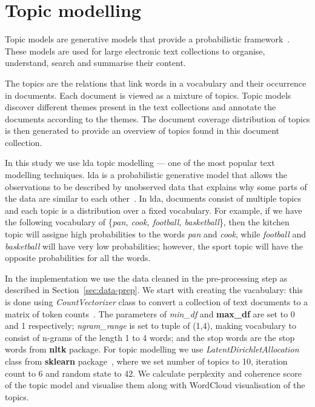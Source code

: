 \section{Topic modelling}
Topic models are generative models that provide a probabilistic framework~\cite{topic-model}. These models are used for large electronic text collections to organise, understand, search and summarise their content. 

The topics are the relations that link words in a vocabulary and their occurrence in documents. Each document is viewed as a mixture of topics. Topic models discover different themes present in the text collections and annotate the documents according to the themes. The document coverage distribution of topics is then generated to provide an overview of topics found in this document collection. 

In this study we use \acrfull{lda} topic modelling --- one of the most popular text modelling techniques. \Acrshort{lda} is a probabilistic generative model that allows the observations to be described by unobserved data that explains why some parts of the data are similar to each other~\cite{tong-topic-modelling}. In \acrshort{lda}, documents consist of multiple topics and each topic is a distribution over a fixed vocabulary. For example, if we have the  following vocabulary of \{\textit{pan, cook, football, basketball}\}, then the kitchen topic will assigne high probabilities to the words \textit{pan} and \textit{cook}, while \textit{football} and \textit{basketball} will have very low probabilities; however, the sport topic will have the opposite probabilities for all the words. 

In the implementation we use the data cleaned in the pre-processing step as described in Section~\ref{sec:data-prep}. We start with creating the vacabulary: this is done using \textit{CountVectorizer} class to convert a collection of text documents to a matrix of token counts~\cite{scikitlearnCountVectorizer}. The parameters of \textit{min\_df} and \textbf{max\_df} are set to 0 and 1 respectively; \textit{ngram\_range} is set to tuple of (1,4), making vocabulary to consist of n-grams of the length 1 to 4 words; and the stop words are the stop words from \textbf{nltk} package. For topic modelling we use \textit{LatentDirichletAllocation} class from \textbf{sklearn} package~\cite{scikitlearnLatentDirichletAllocation}, where we set number of topics to 10, iteration count to 6 and random state to 42. We calculate perplexity and coherence score of the topic model and visualise them along with WordCloud visualisation of the topics. 

